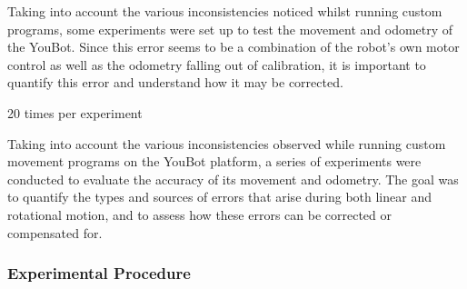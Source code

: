 \documentclass[a4paper, 12pt]{article}
\newif\ifshownotes
\newcommand{\notes}[1]{\ifshownotes\textcolor{blue}{#1}\fi}
\begin{document}
    Taking into account the various inconsistencies noticed whilst running custom programs, some experiments were set up to test the movement and odometry of the YouBot. Since this error seems to be a combination of the robot's own motor control as well as the odometry falling out of calibration, it is important to quantify this error and understand how it may be corrected. 



    \notes{different speeds? proportional or fixed error? does the odometry also drift?}

    20 times per experiment

    Taking into account the various inconsistencies observed while running custom movement programs on the YouBot platform, a series of experiments were conducted to evaluate the accuracy of its movement and odometry. The goal was to quantify the types and sources of errors that arise during both linear and rotational motion, and to assess how these errors can be corrected or compensated for.




    \subsubsection*{Experimental Procedure}
\end{document}
